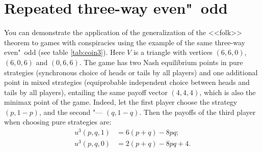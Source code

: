 \section{Repeated three-way even"~odd}\label{sec:ch3/sect2}


You can demonstrate the application of the generalization of the <<folk>> theorem to games with conspiracies using the example of the same three-way even"~odd (see table \ref{tab:coin3}). Here $V$ is a triangle with vertices $(6, 6, 0)$, $(6, 0, 6)$ and $(0, 6, 6)$. The game has two Nash equilibrium points in pure strategies (synchronous choice of heads or tails by all players) and one additional point in mixed strategies (equiprobable independent choice between heads and tails by all players), entailing the same payoff vector $(4, 4, 4)$, which is also the minimax point of the game. Indeed, let the first player choose the strategy $(p, 1 - p)$, and the second "--- $(q, 1 - q)$. Then the payoffs of the third player when choosing pure strategies are: %
\begin{align*}
	u^3(p, q, 1) &= 6 (p + q) - 8 p q; \\
	u^3(p, q, 0) &= 2 (p + q) - 8 p q + 4.
\end{align*}

